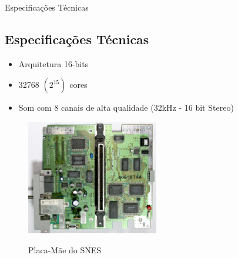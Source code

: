 \documentclass[xcolor=svgnames,handout]{beamer}
\begin{document}

\begin{frame}{Especificações Técnicas}
\subsection{Especificações Técnicas}

\begin{itemize}
  \item{Arquitetura 16-bits}
  \item{32768 $(2^{15})$ cores}
  \item{Som com 8 canais de alta qualidade (32kHz - 16 bit Stereo)}
\end{itemize}

\begin{figure}
  \begin{center}
    \includegraphics[height=5cm, width=\textwidth, keepaspectratio]{SNES-CPU-RGB01_01.jpg}
    \label{fig:}
    \caption{Placa-Mãe do SNES}
  \end{center}
\end{figure}

\end{frame}

\end{document}
